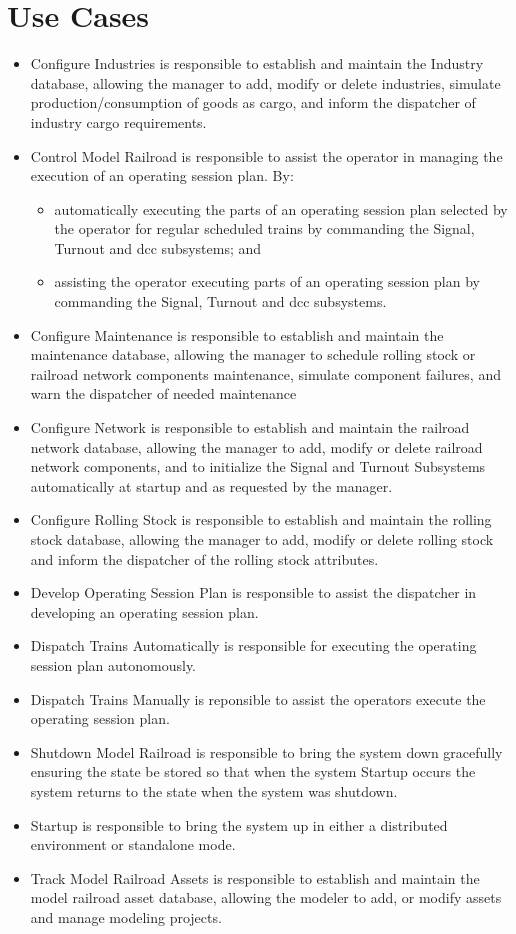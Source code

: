 \section{Use Cases}
\begin{itemize}
  \item Configure Industries is responsible to establish and maintain the Industry database, allowing the manager to add, modify or delete industries, simulate production/consumption of goods as cargo, and inform the dispatcher of industry cargo requirements.
  \item Control Model Railroad is responsible to assist the operator in managing the execution of an operating session plan. By:
\begin{itemize}
  \item automatically executing the parts of an operating session plan selected by the operator for regular scheduled trains by commanding the Signal, Turnout and \gls{dcc} subsystems; and
  \item assisting the operator executing parts of an operating session plan by commanding the Signal, Turnout and \gls{dcc} subsystems.
\end{itemize}
  \item Configure Maintenance is responsible to establish and maintain the maintenance database, allowing the manager to schedule rolling stock or railroad network components maintenance, simulate component failures, and warn the dispatcher of needed maintenance
  \item Configure Network is responsible to establish and maintain the railroad network database, allowing the manager to add, modify or delete railroad network components, and to initialize the Signal and Turnout Subsystems automatically at startup and as requested by the manager.
  \item Configure Rolling Stock is responsible to establish and maintain the rolling stock database, allowing the manager to add, modify or delete rolling stock and inform the dispatcher of the rolling stock attributes.
  \item Develop Operating Session Plan is responsible to assist the dispatcher in developing an operating session plan.
  \item Dispatch Trains Automatically is responsible for executing the operating session plan autonomously.
  \item Dispatch Trains Manually is reponsible to assist the operators execute the operating session plan.
  \item Shutdown Model Railroad is responsible to bring the system down gracefully ensuring the state be stored so that when the system Startup occurs the system returns to the state when the system was shutdown.
  \item Startup is responsible to bring the system up in either a distributed environment or standalone mode.
  \item Track Model Railroad Assets is responsible to establish and maintain the model railroad asset database, allowing the modeler to add, or modify assets and manage modeling projects.
\end{itemize}
